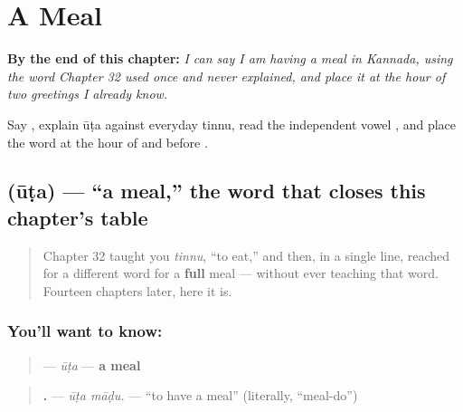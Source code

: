 
\chapter{A Meal}
\label{ch:ka-a-meal}

\begin{chapteropening}
\textbf{By the end of this chapter:} \emph{I can say I am having a meal in Kannada, using the word Chapter 32 used once and never explained, and place it at the hour of two greetings I already know.}

Say  , explain ūṭa against everyday tinnu, read the independent vowel , and place the word at the hour of   and before  .
\end{chapteropening}

\section[\texorpdfstring{\kn{ಊಟ} (ūṭa)}{ಊಟ (ūṭa)}]{ (ūṭa) — \textquotedblleft{}a meal,\textquotedblright{} the word that closes this chapter's table}

\label{lesson:KA-C40-oota}



\begin{quote}
Chapter 32 taught you \emph{tinnu}, \textquotedblleft{}to eat,\textquotedblright{} and then, in a single line, reached for a different word for a \textbf{full} meal — without ever teaching that word. Fourteen chapters later, here it is.
\end{quote}

\subsection*{You'll want to know: }
\begin{quote}
\textbf{} — \emph{ūṭa} — \textbf{a meal}
\end{quote}

\begin{quote}
\textbf{ .} — \emph{ūṭa māḍu.} — \textquotedblleft{}to have a meal\textquotedblright{} (literally, \textquotedblleft{}meal-do\textquotedblright{})
\end{quote}

